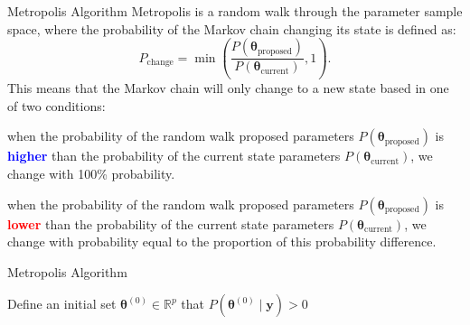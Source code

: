 \begin{frame}{Metropolis Algorithm}
	Metropolis is a random walk through the parameter sample space,
	where the probability of the Markov chain changing its state is defined as:
	$$
		P_{\text{change}} = \min\left({\frac{P (\boldsymbol{\theta}_{\text{proposed}})}{P (\boldsymbol{\theta}_{\text{current}})}},1\right).
	$$
	This means that the Markov chain will only change to a new state based in one of two conditions:
	\begin{vfilleditems}
		\small
		\item when the probability of the random walk proposed parameters
		$P(\boldsymbol{\theta}_{\text{proposed}})$ is \textbf{\textcolor{blue}{higher}}
		than the probability of the current state parameters
		$P(\boldsymbol{\theta}_{\text{current}})$,
		we change with 100\% probability.
		\item when the probability of the random walk proposed parameters
		$P(\boldsymbol{\theta}_{\text{proposed}})$ is \textbf{\textcolor{red}{lower}}
		than the probability of the current state parameters
		$P(\boldsymbol{\theta}_{\text{current}})$,
		we change with probability equal to the proportion of this probability difference.
	\end{vfilleditems}
\end{frame}

\begin{frame}{Metropolis Algorithm}
	\SetAlCapFnt{\normalsize}
	\SetAlCapNameFnt{\normalsize}
	\begin{algorithm}[H]
		\DontPrintSemicolon
		\SetAlgoNoEnd
		\SetAlgoLined
		Define an initial set $\boldsymbol{\theta}^{(0)} \in \mathbb{R}^p$ that $P\left(\boldsymbol{\theta}^{(0)} \mid \mathbf{y} \right) > 0$\;
		\caption{Metropolis}
	\end{algorithm}
\end{frame}


